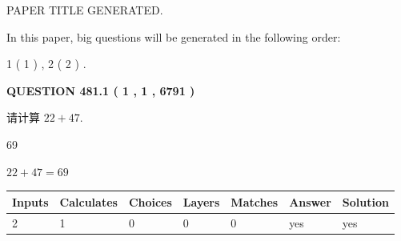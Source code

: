 \documentclass{ctexart}
\begin{document}
   
\vspace{0.2in}
   
   
   
   
   
   
   
   
 \vspace{0.2in}
 
 
 
 
   
   
 PAPER TITLE GENERATED.
   
   
   
\vspace{0.2in}
   
In this paper, big questions will be generated in the following order: 
   
   
   1 ( 1 )
 ,
   2 ( 2 )
 .
  
\vspace{0.2in}
  
{\textbf{\Large{QUESTION
481.1 
 ( 1 , 1 , 6791 )
}}}
  
  
 
请计算 $ %
22 +  %
47 $.
 
 
 
\noindent{}
 
 

69
 
 
\noindent{}
 
 

 
 
 
\noindent{}
 
 

$ %
22 +  %
47=   %
69$
 
 
\noindent{}
 
 

 
   
   
   
   
\noindent\begin{tabular}{|l|l|l|l|l|l|l|}
 \hline
Inputs & Calculates & Choices & Layers & Matches & Answer & Solution \\ \hline
 2  & 
 1  & 
 0
  & 
 0  & 
 0  & 
  yes & 
  yes 
  \\ \hline
 \end{tabular}
   
\end{document}
